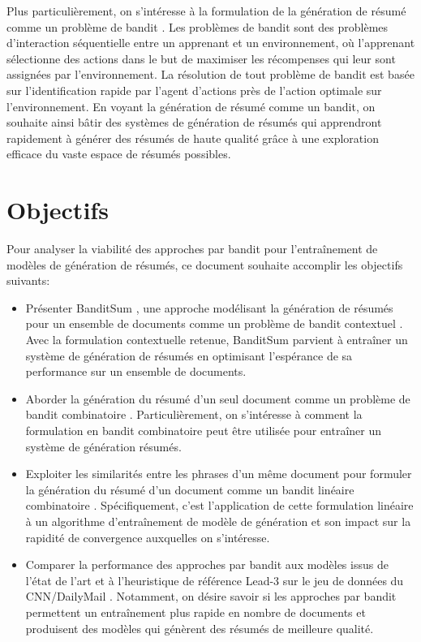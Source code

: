 Plus particulièrement, on s'intéresse à la formulation 
de la génération de résumé comme un problème de bandit \citep{Robbins:1952}.
Les problèmes de bandit sont des problèmes d'interaction séquentielle
entre un apprenant et un environnement, où l'apprenant sélectionne 
des actions dans le but de maximiser les récompenses 
qui leur sont assignées par l'environnement.
La résolution de tout problème de bandit est basée sur 
l'identification rapide par l'agent d'actions près 
de l'action optimale sur l'environnement.
En voyant la génération de résumé comme un bandit, on souhaite ainsi bâtir 
des systèmes de génération de résumés qui apprendront rapidement à générer 
des résumés de haute qualité grâce à une exploration efficace du vaste espace de résumés 
possibles. 


\section*{Objectifs}

Pour analyser la viabilité des approches par bandit pour l'entraînement 
de modèles de génération de résumés, ce document souhaite accomplir les objectifs suivants:

\begin{itemize}
      \item Présenter BanditSum \citep{dong2018banditsum}, une approche 
            modélisant la génération de résumés pour un ensemble de documents
            comme un problème de bandit contextuel \citep{contextual_bandits}.
            Avec la formulation contextuelle retenue, BanditSum 
            parvient à entraîner un système de génération de résumés 
            en optimisant l'espérance de sa performance sur un 
            ensemble de documents.
      \item Aborder la génération du résumé d'un seul document comme 
            un problème de bandit combinatoire \citep{pmlr-v28-chen13a}.
            Particulièrement, on s'intéresse à comment la formulation 
            en bandit combinatoire peut être utilisée pour entraîner un système 
            de génération résumés.   
      \item Exploiter les similarités entre les phrases d'un même 
            document pour formuler la génération du résumé d'un 
            document comme un bandit linéaire combinatoire \citep{NEURIPS2018_207f8801}.
            Spécifiquement, c'est l'application de cette formulation linéaire
            à un algorithme d'entraînement de modèle de génération 
            et son impact sur la rapidité de convergence auxquelles on s'intéresse.
      \item Comparer la performance des approches par bandit 
            aux modèles issus de l'état de l'art et à l'heuristique de
            référence Lead-3 \citep{10.5555/3298483.3298681} sur le jeu de données 
            du CNN/DailyMail \citep{hermann2015teaching}.
            Notamment, on désire savoir si les approches par bandit 
            permettent un entraînement plus rapide en nombre de documents
            et produisent des modèles qui génèrent des résumés de meilleure qualité.
\end{itemize}

